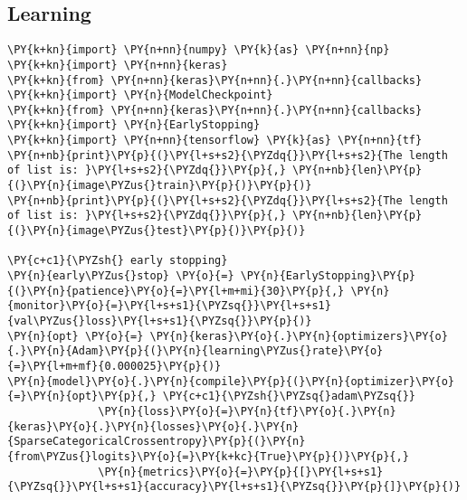 \subsection{    Learning}

    \begin{tcolorbox}[breakable, size=fbox, boxrule=1pt, pad at break*=1mm,colback=cellbackground, colframe=cellborder]
\begin{Verbatim}[commandchars=\\\{\}]
\PY{k+kn}{import} \PY{n+nn}{numpy} \PY{k}{as} \PY{n+nn}{np}
\PY{k+kn}{import} \PY{n+nn}{keras}
\PY{k+kn}{from} \PY{n+nn}{keras}\PY{n+nn}{.}\PY{n+nn}{callbacks} \PY{k+kn}{import} \PY{n}{ModelCheckpoint}
\PY{k+kn}{from} \PY{n+nn}{keras}\PY{n+nn}{.}\PY{n+nn}{callbacks} \PY{k+kn}{import} \PY{n}{EarlyStopping}
\PY{k+kn}{import} \PY{n+nn}{tensorflow} \PY{k}{as} \PY{n+nn}{tf}
\PY{n+nb}{print}\PY{p}{(}\PY{l+s+s2}{\PYZdq{}}\PY{l+s+s2}{The length of list is: }\PY{l+s+s2}{\PYZdq{}}\PY{p}{,} \PY{n+nb}{len}\PY{p}{(}\PY{n}{image\PYZus{}train}\PY{p}{)}\PY{p}{)}
\PY{n+nb}{print}\PY{p}{(}\PY{l+s+s2}{\PYZdq{}}\PY{l+s+s2}{The length of list is: }\PY{l+s+s2}{\PYZdq{}}\PY{p}{,} \PY{n+nb}{len}\PY{p}{(}\PY{n}{image\PYZus{}test}\PY{p}{)}\PY{p}{)}

\PY{c+c1}{\PYZsh{} early stopping}
\PY{n}{early\PYZus{}stop} \PY{o}{=} \PY{n}{EarlyStopping}\PY{p}{(}\PY{n}{patience}\PY{o}{=}\PY{l+m+mi}{30}\PY{p}{,} \PY{n}{monitor}\PY{o}{=}\PY{l+s+s1}{\PYZsq{}}\PY{l+s+s1}{val\PYZus{}loss}\PY{l+s+s1}{\PYZsq{}}\PY{p}{)}
\PY{n}{opt} \PY{o}{=} \PY{n}{keras}\PY{o}{.}\PY{n}{optimizers}\PY{o}{.}\PY{n}{Adam}\PY{p}{(}\PY{n}{learning\PYZus{}rate}\PY{o}{=}\PY{l+m+mf}{0.000025}\PY{p}{)}
\PY{n}{model}\PY{o}{.}\PY{n}{compile}\PY{p}{(}\PY{n}{optimizer}\PY{o}{=}\PY{n}{opt}\PY{p}{,} \PY{c+c1}{\PYZsh{}\PYZsq{}adam\PYZsq{}}
              \PY{n}{loss}\PY{o}{=}\PY{n}{tf}\PY{o}{.}\PY{n}{keras}\PY{o}{.}\PY{n}{losses}\PY{o}{.}\PY{n}{SparseCategoricalCrossentropy}\PY{p}{(}\PY{n}{from\PYZus{}logits}\PY{o}{=}\PY{k+kc}{True}\PY{p}{)}\PY{p}{,}
              \PY{n}{metrics}\PY{o}{=}\PY{p}{[}\PY{l+s+s1}{\PYZsq{}}\PY{l+s+s1}{accuracy}\PY{l+s+s1}{\PYZsq{}}\PY{p}{]}\PY{p}{)}


\end{Verbatim}
\end{tcolorbox}
